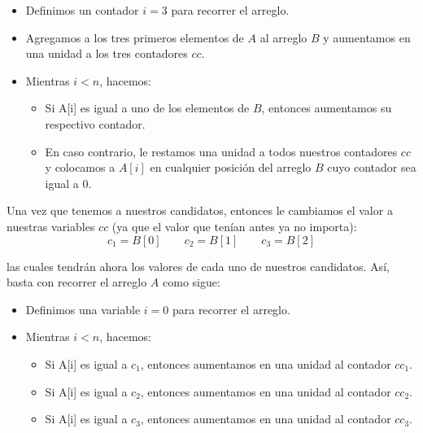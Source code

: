 \documentclass[letterpaper,11pt]{article}
\begin{document}
\begin{enumerate}
\begin{itemize}
        \item Definimos un contador $i = 3$ para recorrer el arreglo.

        \item Agregamos a los tres primeros elementos de $A$ al arreglo $B$ y 
        aumentamos en una unidad a los tres contadores $cc$.
        
        \item Mientras $i < n$, hacemos:
        \begin{itemize}
            \item Si A[i] es igual a uno de los elementos de $B$, entonces 
            aumentamos su respectivo contador.

            \item En caso contrario, le restamos una unidad a todos nuestros 
            contadores $cc$ y colocamos a $A[i]$ en cualquier posición del arreglo 
            $B$ cuyo contador sea igual a $0$. 
        \end{itemize}
    \end{itemize}

    Una vez que tenemos a nuestros candidatos, entonces le cambiamos el valor a 
    nuestras variables $cc$ (ya que el valor que tenían antes ya no importa):
    \begin{equation*}
        c_1 = B[0] \quad \quad c_2 = B[1] \quad \quad c_3 = B[2]
    \end{equation*} 
    
    las cuales tendrán ahora los valores de cada uno de nuestros candidatos. 
    Así, basta con recorrer el arreglo $A$ como sigue:
    \begin{itemize}
        \item Definimos una variable $i=0$ para recorrer el arreglo.

        \item Mientras $i < n$, hacemos:
        \begin{itemize}
            \item Si A[i] es igual a $c_1$, entonces aumentamos en una unidad 
            al contador $cc_1$.

            \item Si A[i] es igual a $c_2$, entonces aumentamos en una unidad 
            al contador $cc_2$.

            \item Si A[i] es igual a $c_3$, entonces aumentamos en una unidad 
            al contador $cc_3$.
        \end{itemize}
    \end{itemize}


\end{enumerate}
\end{document}
